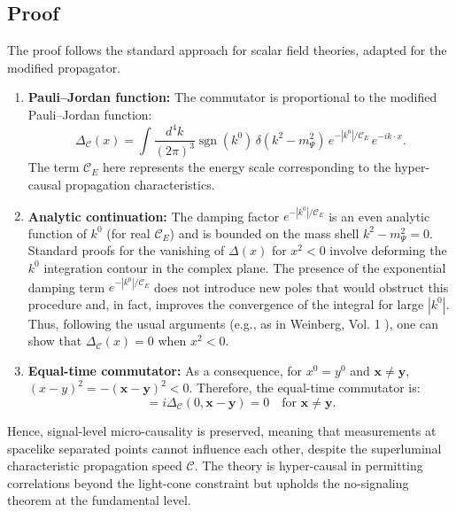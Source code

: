 \documentclass[11pt,a4paper]{article}
\newcommand{\PsiField}{\ensuremath{\Psi}}
\newcommand{\PropSpeed}{\ensuremath{\mathscr{C}}}
\begin{document}
\subsection*{Proof}
The proof follows the standard approach for scalar field theories, adapted for the modified propagator.
\begin{enumerate}
    \item \textbf{Pauli–Jordan function:} The commutator is proportional to the modified Pauli–Jordan function:
    \begin{equation}
        \Delta_{\PropSpeed}(x) = \int \frac{d^{4}k}{(2\pi)^{3}} \operatorname{sgn}(k^{0})\, \delta(k^{2}-m_\PsiField^{2})\, e^{-|k^{0}|/\PropSpeed_{E}}\, e^{-ik\cdot x}.
    \end{equation}
    The term $\PropSpeed_{E}$ here represents the energy scale corresponding to the hyper-causal propagation characteristics.

    \item \textbf{Analytic continuation:} The damping factor $e^{-|k^{0}|/\PropSpeed_{E}}$ is an even analytic function of $k^{0}$ (for real $\PropSpeed_{E}$) and is bounded on the mass shell $k^{2}-m_\PsiField^{2}=0$. Standard proofs for the vanishing of $\Delta(x)$ for $x^2 < 0$ involve deforming the $k^0$ integration contour in the complex plane. The presence of the exponential damping term $e^{-|k^{0}|/\PropSpeed_{E}}$ does not introduce new poles that would obstruct this procedure and, in fact, improves the convergence of the integral for large $|k^0|$. Thus, following the usual arguments (e.g., as in Weinberg, Vol. 1 \cite{Weinberg1995}), one can show that $\Delta_{\PropSpeed}(x)=0$ when $x^{2}<0$.

    \item \textbf{Equal-time commutator:} As a consequence, for $x^0=y^0$ and $\mathbf{x} \neq \mathbf{y}$, $(x-y)^2 = -(\mathbf{x}-\mathbf{y})^2 < 0$. Therefore, the equal-time commutator is:
    \begin{equation}
        [\PsiField(t,\mathbf x),\PsiField(t,\mathbf y)] = i\Delta_{\PropSpeed}(0,\mathbf x-\mathbf y)=0 \quad \text{for } \mathbf{x} \neq \mathbf{y}.
    \end{equation}
\end{enumerate}
Hence, signal-level micro-causality is preserved, meaning that measurements at spacelike separated points cannot influence each other, despite the superluminal characteristic propagation speed \PropSpeed. The theory is hyper-causal in permitting correlations beyond the light-cone constraint but upholds the no-signaling theorem at the fundamental level.
\end{document}
